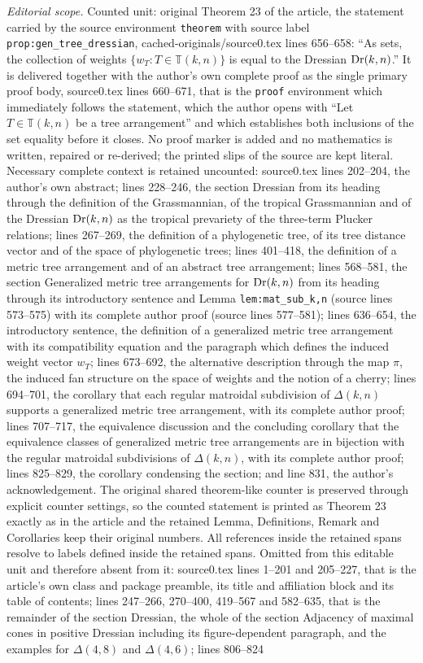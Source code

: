 \documentclass[10pt,a4paper]{amsart}
\newcommand{\TT}{\mathbb{T}}
\DeclareMathOperator{\Dr}{\rm Dr}
\theoremstyle{plain}
\theoremstyle{definition}
\numberwithin{subcase}{case}
\begin{document}
\noindent\textit{Editorial scope.} Counted unit: original Theorem 23 of the article, the statement carried by the source environment \texttt{theorem} with source label \texttt{prop:gen\_tree\_dressian}, cached-originals/source0.tex lines 656--658: ``As sets, the collection of weights $\{w_T \colon T \in \TT(k,n) \}$ is equal to the Dressian $\Dr(k,n)$.'' It is delivered together with the author's own complete proof as the single primary proof body, source0.tex lines 660--671, that is the \texttt{proof} environment which immediately follows the statement, which the author opens with ``Let $T \in \TT(k,n)$ be a tree arrangement'' and which establishes both inclusions of the set equality before it closes. No proof marker is added and no mathematics is written, repaired or re-derived; the printed slips of the source are kept literal. Necessary complete context is retained uncounted: source0.tex lines 202--204, the author's own abstract; lines 228--246, the section Dressian from its heading through the definition of the Grassmannian, of the tropical Grassmannian and of the Dressian $\Dr(k,n)$ as the tropical prevariety of the three-term Plucker relations; lines 267--269, the definition of a phylogenetic tree, of its tree distance vector and of the space of phylogenetic trees; lines 401--418, the definition of a metric tree arrangement and of an abstract tree arrangement; lines 568--581, the section Generalized metric tree arrangements for $\Dr(k,n)$ from its heading through its introductory sentence and Lemma \texttt{lem:mat\_sub\_k,n} (source lines 573--575) with its complete author proof (source lines 577--581); lines 636--654, the introductory sentence, the definition of a generalized metric tree arrangement with its compatibility equation and the paragraph which defines the induced weight vector $w_T$; lines 673--692, the alternative description through the map $\pi$, the induced fan structure on the space of weights and the notion of a cherry; lines 694--701, the corollary that each regular matroidal subdivision of $\Delta(k,n)$ supports a generalized metric tree arrangement, with its complete author proof; lines 707--717, the equivalence discussion and the concluding corollary that the equivalence classes of generalized metric tree arrangements are in bijection with the regular matroidal subdivisions of $\Delta(k,n)$, with its complete author proof; lines 825--829, the corollary condensing the section; and line 831, the author's acknowledgement. The original shared theorem-like counter is preserved through explicit counter settings, so the counted statement is printed as Theorem 23 exactly as in the article and the retained Lemma, Definitions, Remark and Corollaries keep their original numbers. All references inside the retained spans resolve to labels defined inside the retained spans. Omitted from this editable unit and therefore absent from it: source0.tex lines 1--201 and 205--227, that is the article's own class and package preamble, its title and affiliation block and its table of contents; lines 247--266, 270--400, 419--567 and 582--635, that is the remainder of the section Dressian, the whole of the section Adjacency of maximal cones in positive Dressian including its figure-dependent paragraph, and the examples for $\Delta(4,8)$ and $\Delta(4,6)$; lines 806--824 
\end{document}
